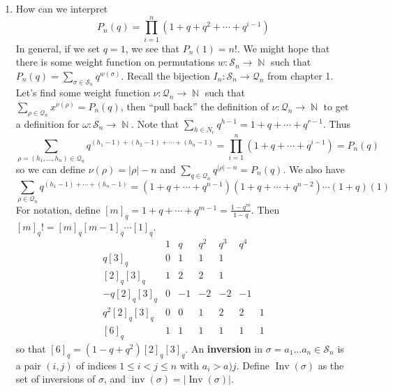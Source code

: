 \documentclass[11pt, a4paper]{memoir}
\DeclareMathOperator{\N}{{\mathbb{N}}}
\theoremstyle{change}
\theoremstyle{plain}
\theoremstyle{nonumberplain}
\DeclareMathOperator{\Inv}{Inv}
\DeclareMathOperator{\inv}{inv}
\numberwithin{equation}{section}
\begin{document}
\begin{enumerate}
    \item How can we interpret
        \begin{equation*}
            P_n(q)=\prod_{i=1}^n(1+q+q^2+\cdots+q^{i-1})
        \end{equation*}
        In general, if we set $q=1$, we see that $P_n(1)=n!$.
        We might hope that there is some weight function on permutations $w:\mathcal{S}_n\to\N$ such that $P_n(q)=\sum_{\sigma\in\mathcal{S}_n}q^{w(\sigma)}$.
        Recall the bijection $I_n:\mathcal{S}_n\to\mathcal{Q}_n$ from chapter 1.
        Let's find some weight function $\nu:\mathcal{Q}_n\to\N$ such that $\sum_{\rho\in\mathcal{Q}_n}x^{\nu(\rho)}=P_n(q)$, then ``pull back'' the definition of $\nu:\mathcal{Q}_n\to\N$ to get a definition for $\omega:\mathcal{S}_n\to\N$.
        Note that $\sum_{h\in N_r}q^{h-1}=1+q+\cdots+q^{r-1}$.
        Thus
        \begin{equation*}
            \sum_{\rho=(h_1,\ldots,h_n)\in\mathcal{Q}_n}q^{(h_1-1)+(h_2-1)+\cdots+(h_n-1)} = \prod_{i=1}^n(1+q+\cdots+q^{i-1})=P_n(q)
        \end{equation*}
        so we can define $\nu(\rho)=|\rho|-n$ and $\sum_{q\in\mathcal{Q}_n}q^{|\rho|-n}=P_n(q)$.
        We also have
        \begin{equation*}
            \sum_{\rho\in\mathcal{Q}_n}q^{(h_1-1)+\cdots+(h_n-1)} = (1+q+\cdots+q^{n-1})(1+q+\cdots+q^{n-2})\cdots(1+q)(1)
        \end{equation*}
        For notation, define $[m]_q=1+q+\cdots+q^{m-1}=\frac{1-q^m}{1-q}$.
        Then $[m]_q!=[m]_q[m-1]_q\cdots[1]_q$.
        \begin{equation*}
            \begin{array}{c|cccccc}
                &1&q&q^2&q^3&q^4\\
                \hline
                q[3]_q & 0&1&1&1\\
                \hline
                [2]_q[3]_q & 1&2&2&1\\
                -q[2]_q[3]_q & 0&-1&-2&-2&-1\\
                q^2[2]_q[3]_q & 0&0&1&2&2&1\\
                \hline
                [6]_q & 1&1&1&1&1&1
            \end{array}
        \end{equation*}
        so that $[6]_q=(1-q+q^2)[2]_q[3]_q$.
        An \textbf{inversion} in $\sigma=a_1\ldots a_n\in\mathcal{S}_n$ is a pair $(i,j)$ of indices $1\leq i<j\leq n$ with $a_i>a)j$.
        Define $\Inv(\sigma)$ as the set of inversions of $\sigma$, and $\inv(\sigma)=|\Inv(\sigma)|$.

\end{enumerate}
\end{document}
